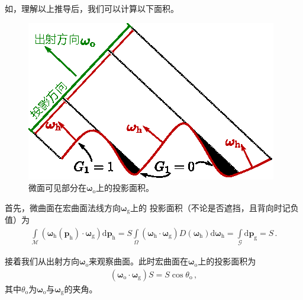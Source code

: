 如，理解以上推导后，我们可以计算以下面积。
\begin{figure}[htbp]
    \centering
    \includegraphics[width=0.5\linewidth]{Pictures/chap08/ProjectionsMicrofacet.eps}
    \caption{微面可见部分在${\bm\omega}_{\mathrm{o}}$上的投影面积。}
    \label{fig:08ex01-ProjectionsMicrofacetArea}
\end{figure}

首先，微曲面在宏曲面法线方向${\bm\omega}_{\mathrm{g}}$上的
投影面积（不论是否遮挡，且背向时记负值）为
\begin{align}
    \int\limits_{\mathcal{M}}({\bm\omega}_{\mathrm{h}}({\bm p}_{\mathrm{h}})
    \cdot{\bm\omega}_{\mathrm{g}})\mathrm{d}{\bm p}_{\mathrm{h}}
    =S\int\limits_{\varOmega}({\bm\omega}_{\mathrm{h}}\cdot{\bm\omega}_{\mathrm{g}})
    D({\bm\omega}_{\mathrm{h}})\mathrm{d}{\bm\omega}_{\mathrm{h}}
    =\int\limits_{\mathcal{G}}\mathrm{d}{\bm p}_{\mathrm{g}}=S\, .
\end{align}

接着我们从出射方向${\bm\omega}_{\mathrm{o}}$来观察曲面。此时宏曲面在${\bm\omega}_{\mathrm{o}}$上的投影面积为
\begin{align}
    \label{eq:08ex01-AreaMacrosurface}
    ({\bm\omega}_{\mathrm{o}}\cdot{\bm\omega}_{\mathrm{g}})S=S\cos\theta_{\mathrm{o}}\, ,
\end{align}
其中$\theta_{\mathrm{o}}$为${\bm\omega}_{\mathrm{o}}$与${\bm\omega}_{\mathrm{g}}$的夹角。

